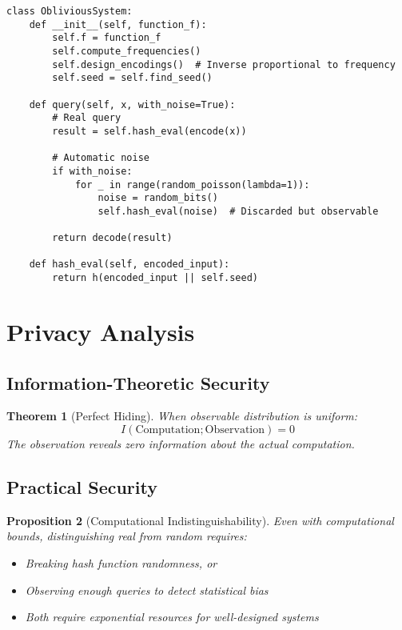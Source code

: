 \documentclass[11pt,final]{article}
\newtheorem{theorem}{Theorem}[section]
\newtheorem{proposition}[theorem]{Proposition}
\begin{document}
\begin{verbatim}
class ObliviousSystem:
    def __init__(self, function_f):
        self.f = function_f
        self.compute_frequencies()
        self.design_encodings()  # Inverse proportional to frequency
        self.seed = self.find_seed()
        
    def query(self, x, with_noise=True):
        # Real query
        result = self.hash_eval(encode(x))
        
        # Automatic noise
        if with_noise:
            for _ in range(random_poisson(lambda=1)):
                noise = random_bits()
                self.hash_eval(noise)  # Discarded but observable
                
        return decode(result)
        
    def hash_eval(self, encoded_input):
        return h(encoded_input || self.seed)
\end{verbatim}

\section{Privacy Analysis}

\subsection{Information-Theoretic Security}

\begin{theorem}[Perfect Hiding]
When observable distribution is uniform:
\begin{equation}
I(\text{Computation}; \text{Observation}) = 0
\end{equation}
The observation reveals zero information about the actual computation.
\end{theorem}

\subsection{Practical Security}

\begin{proposition}[Computational Indistinguishability]
Even with computational bounds, distinguishing real from random requires:
\begin{itemize}
    \item Breaking hash function randomness, or
    \item Observing enough queries to detect statistical bias
    \item Both require exponential resources for well-designed systems
\end{itemize}
\end{proposition}
\end{document}
